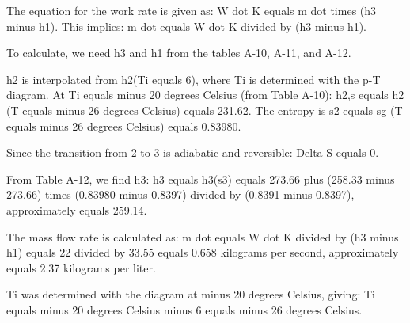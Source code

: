 The equation for the work rate is given as:  
W dot K equals m dot times (h3 minus h1).  
This implies:  
m dot equals W dot K divided by (h3 minus h1).

To calculate, we need h3 and h1 from the tables A-10, A-11, and A-12.  

h2 is interpolated from h2(Ti equals 6), where Ti is determined with the p-T diagram.  
At Ti equals minus 20 degrees Celsius (from Table A-10):  
h2,s equals h2 (T equals minus 26 degrees Celsius) equals 231.62.  
The entropy is s2 equals sg (T equals minus 26 degrees Celsius) equals 0.83980.

Since the transition from 2 to 3 is adiabatic and reversible:  
Delta S equals 0.  

From Table A-12, we find h3:  
h3 equals h3(s3) equals 273.66 plus (258.33 minus 273.66) times (0.83980 minus 0.8397) divided by (0.8391 minus 0.8397), approximately equals 259.14.

The mass flow rate is calculated as:  
m dot equals W dot K divided by (h3 minus h1) equals 22 divided by 33.55 equals 0.658 kilograms per second, approximately equals 2.37 kilograms per liter.

Ti was determined with the diagram at minus 20 degrees Celsius, giving:  
Ti equals minus 20 degrees Celsius minus 6 equals minus 26 degrees Celsius.